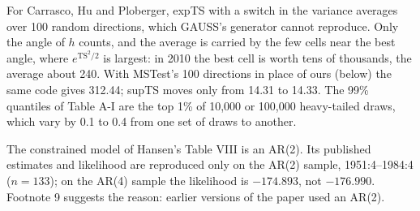 For Carrasco, Hu and Ploberger, expTS with a switch in the variance averages over 100 random directions, which GAUSS's generator cannot reproduce. Only the angle of $h$ counts, and the average is carried by the few cells near the best angle, where $e^{\mathrm{TS}^2/2}$ is largest: in 2010 the best cell is worth tens of thousands, the average about 240. With MSTest's 100 directions in place of ours (below) the same code gives 312.44; supTS moves only from 14.31 to 14.33. The 99\% quantiles of Table A-I are the top 1\% of 10,000 or 100,000 heavy-tailed draws, which vary by 0.1 to 0.4 from one set of draws to another.

The constrained model of Hansen's Table VIII is an AR(2). Its published estimates and likelihood are reproduced only on the AR(2) sample, 1951:4--1984:4 ($n=133$); on the AR(4) sample the likelihood is $-174.893$, not $-176.990$. Footnote 9 suggests the reason: earlier versions of the paper used an AR(2).

